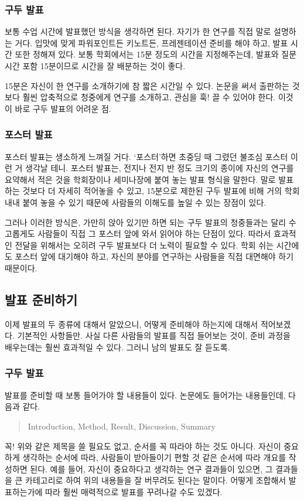 \subsubsection{구두 발표}
보통 수업 시간에 발표했던 방식을 생각하면 된다. 자기가 한 연구를 직접 말로
설명하는 거다. 입맛에 맞게 파워포인트든 키노트든, 프레젠테이션 준비를 해야 하고,
발표 시간 또한 정해져 있다. 보통 학회에서는 15분 정도의 시간을 지정해주는데,
발표와 질문 시간 포함 15분이므로 시간을 잘 배분하는 것이 좋다.

15분은 자신이 한 연구를 소개하기에 참 짧은 시간일 수 있다. 논문을 써서 출판하는
것보다 훨씬 압축적으로 청중에게 연구를 소개하고, 관심을 훅! 끌 수 있어야
한다. 이것이 바로 구두 발표의 어려운 점.

\subsubsection{포스터 발표}
포스터 발표는 생소하게 느껴질 거다. ‘포스터’하면 초중딩 때 그렸던 불조심 포스터
이런 거 생각날 테니. 포스터 발표는, 전지나 전지 반 정도 크기의 종이에 자신의
연구를 요약해서 적은 것을 학회장이나 세미나장에 붙여 놓는 발표 형식을
말한다. 말로 발표하는 것보다 더 자세히 적어놓을 수 있고, 15분으로 제한된 구두
발표에 비해 거의 학회 내내 붙여 놓을 수 있기 때문에 사람들의 이해도를 높일 수
있는 장점이 있다.

그러나 이러한 방식은, 가만히 앉아 있기만 하면 되는 구두 발표의 청중들과는 달리
수고롭게도 사람들이 직접 그 포스터 앞에 와서 읽어야 하는 단점이 있다. 따라서
효과적인 전달을 위해서는 오히려 구두 발표보다 더 노력이 필요할 수 있다. 학회 쉬는
시간에도 포스터 앞에 대기해야 하고, 자신의 분야를 연구하는 사람들을 직접 대면해야
하기 때문이다.

\subsection{발표 준비하기}
이제 발표의 두 종류에 대해서 알았으니, 어떻게 준비해야 하는지에 대해서
적어보겠다. 기본적인 사항들만. 사실 다른 사람들의 발표를 직접 들어보는 것이, 준비
과정을 배우는데는 훨씬 효과적일 수 있다. 그러니 남의 발표도 잘 듣도록.

\subsubsection{구두 발표}
발표를 준비할 때 보통 들어가야 할 내용들이 있다. 논문에도 들어가는 내용들인데,
다음과 같다.

\begin{quote}
\begin{center}
\textsf{Introduction, Method, Result, Discussion, Summary}
\end{center}
\end{quote}
꼭! 위와 같은 제목을 쓸 필요도 없고, 순서를 꼭 따라야 하는 것도 아니다. 자신이 중요하게 생각하는 순서에 따라, 사람들이 받아들이기 편할 것 같은 순서에 따라 개요를 작성하면 된다. 예를 들어, 자신이 중요하다고 생각하는 연구 결과들이 있으면, 그 결과들을 큰 카테고리로 하여 위의 내용들을 잘 버무려도 된다는 말이다. 어떻게 조합해서 발표하는가에 따라 훨씬 매력적으로 발표를 꾸려나갈 수도 있겠다.\\

